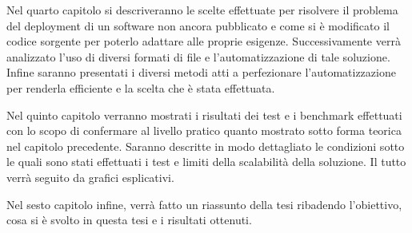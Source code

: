 \documentclass[../main.tex]{subfiles}
\begin{document}
Nel quarto capitolo si descriveranno le scelte effettuate per risolvere il problema del deployment di un software non ancora pubblicato e come si è modificato il codice sorgente per poterlo adattare alle proprie esigenze. Successivamente verrà analizzato l'uso di diversi formati di file e l'automatizzazione di tale soluzione. Infine saranno presentati i diversi metodi atti a perfezionare l'automatizzazione per renderla efficiente e la scelta che è stata effettuata.

Nel quinto capitolo verranno mostrati i risultati dei test e i benchmark effettuati con lo scopo di confermare al livello pratico quanto mostrato sotto forma teorica nel capitolo precedente. Saranno descritte in modo dettagliato le condizioni sotto le quali sono stati effettuati i test e limiti della scalabilità della soluzione. Il tutto verrà seguito da grafici esplicativi.

Nel sesto capitolo infine, verrà fatto un riassunto della tesi ribadendo l'obiettivo, cosa si è svolto in questa tesi e i risultati ottenuti.
\end{document}
